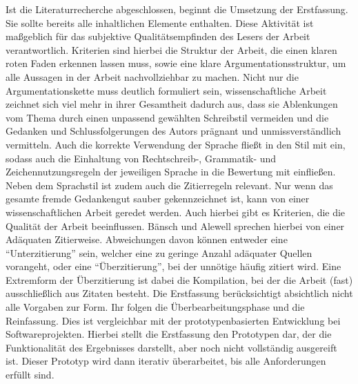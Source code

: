 Ist die Literaturrecherche abgeschlossen, beginnt die Umsetzung der Erstfassung. Sie sollte bereits alle inhaltlichen Elemente enthalten. Diese Aktivität ist maßgeblich für das subjektive Qualitätsempfinden des Lesers der Arbeit verantwortlich. Kriterien sind hierbei die Struktur der Arbeit, die einen klaren roten Faden erkennen lassen muss, sowie eine klare Argumentationsstruktur, um alle Aussagen in der Arbeit nachvollziehbar zu machen.\cite[Vgl.][S. 59]{Baensch:2013}
Nicht nur die Argumentationskette muss deutlich formuliert sein, wissenschaftliche Arbeit zeichnet sich viel mehr in ihrer Gesamtheit dadurch aus, dass sie Ablenkungen vom Thema durch einen unpassend gewählten Schreibstil vermeiden und die Gedanken und Schlussfolgerungen des Autors prägnant und unmissverständlich vermitteln. Auch die korrekte Verwendung der Sprache fließt in den Stil mit ein, sodass auch die Einhaltung von Rechtschreib-, Grammatik- und Zeichennutzungsregeln der jeweiligen Sprache in die Bewertung mit einfließen.\cite[Vgl.][S. 25-27]{Baensch:2013} 
Neben dem Sprachstil ist zudem auch die Zitierregeln relevant. Nur wenn das gesamte fremde Gedankengut sauber gekennzeichnet ist, kann von einer wissenschaftlichen Arbeit geredet werden. Auch hierbei gibt es Kriterien, die die Qualität der Arbeit beeinflussen. Bänsch und Alewell sprechen hierbei von einer Adäquaten Zitierweise. Abweichungen davon können entweder eine \enquote{Unterzitierung} sein, welcher eine zu geringe Anzahl adäquater Quellen vorangeht, oder eine \enquote{Überzitierung}, bei der unnötige häufig zitiert wird. Eine Extremform der Überzitierung ist dabei die Kompilation, bei der die Arbeit (fast) ausschließlich aus Zitaten besteht.\cite[Vgl.][S.11 f.]{Baensch:2013}
Die Erstfassung berücksichtigt absichtlich nicht alle Vorgaben zur Form. Ihr folgen die Überbearbeitungsphase und die Reinfassung. Dies ist vergleichbar mit der prototypenbasierten Entwicklung bei Softwareprojekten. Hierbei stellt die Erstfassung den Prototypen dar, der die Funktionalität des Ergebnisses darstellt, aber noch nicht vollständig ausgereift ist. Dieser Prototyp wird dann iterativ überarbeitet, bis alle Anforderungen erfüllt sind.\cite[Vgl.][S. 363]{Liggesmeyer:2009}

